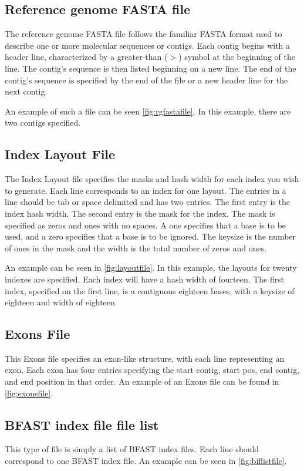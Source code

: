 \documentclass[a4paper,12pt]{book}
\newcommand{\rGFF}{reference genome FASTA file}
\newcommand{\RGFF}{Reference genome FASTA file}
\newcommand{\BIF}{BFAST index file} %
\begin{document}
\subsection{\RGFF{}}
\label{sec:rgfastafile}
The \rGFF{} follows the familiar FASTA format used to describe one or more molecular sequences or contigs.
Each contig begins with a header line, characterized by a greater-than ($>$) symbol at the beginning of the line.
The contig's sequence is then listed beginning on a new line.
The end of the contig's sequence is specified by the end of the file or a new header line for the next contig.

An example of such a file can be seen \autoref{fig:rgfastafile}.
In this example, there are two contigs specified. 

\subsection{Index Layout File}
\label{sec:layoutfile}
The Index Layout file specifies the masks and hash width for each index you wish to generate.
Each line corresponds to an index for one layout.
The entries in a line should be tab or space delimited and has two entries.
The first entry is the index hash width.
The second entry is the mask for the index.
The mask is specified as zeros and ones with no spaces.
A one specifies that a base is to be used, and a zero specifies that a base is to be ignored.
The keysize is the number of ones in the mask and the width is the total number of zeros and ones.

An example can be seen in \autoref{fig:layoutfile}.
In this example, the layouts for twenty indexes are specified.
Each index will have a hash width of fourteen.
The first index, specified on the first line, is a contiguous eighteen bases, with a keysize of eighteen and width of eighteen.

\subsection{Exons File}
\label{sec:exonsfile}
This Exons file specifies an exon-like structure, with each line representing an exon.
Each exon has four entries specifying the start contig, start pos, end contig, and end position in that order.
An example of an Exons file can be found in \autoref{fig:exonsfile}. 

\subsection{\BIF{} file list}
\label{sec:biflistfile}
This type of file is simply a list of \BIF{s}.
Each line should correspond to one \BIF{}.
An example can be seen in \autoref{fig:biflistfile}.
\end{document}
